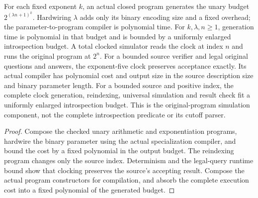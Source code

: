 \begin{lemma}
\label{lem:intro-growing-clock}
\leanok
For each fixed exponent $k$, an actual closed program generates the unary budget
$2^{(\lambda n+1)^k}$. Hardwiring $\lambda$ adds only its binary encoding size
and a fixed overhead; the parameter-to-program compiler is polynomial time.
For $k,\lambda,n\geq1$, generation time is polynomial in that budget and is
bounded by a uniformly enlarged introspection budget. A total clocked simulator
reads the clock at index $n$ and runs the original program at $2^n$.
For a bounded source verifier and legal original questions and answers,
the exponent-five clock preserves acceptance exactly.
Its actual compiler has polynomial cost and output size in the source
description size and binary parameter length. For a bounded source and
positive index, the complete clock generation, reindexing, universal
simulation and result check fit a uniformly enlarged introspection budget.
This is the original-program simulation component, not the complete
introspection predicate or its cutoff parser.
\end{lemma}
\begin{proof}
\leanok
Compose the checked unary arithmetic and exponentiation programs, hardwire
the binary parameter using the actual specialization compiler, and bound the
cost by a fixed polynomial in the output budget. The reindexing program
changes only the source index. Determinism and the legal-query runtime bound
show that clocking preserves the source's accepting result.
Compose the actual program constructors for compilation, and absorb the
complete execution cost into a fixed polynomial of the generated budget.
\end{proof}

